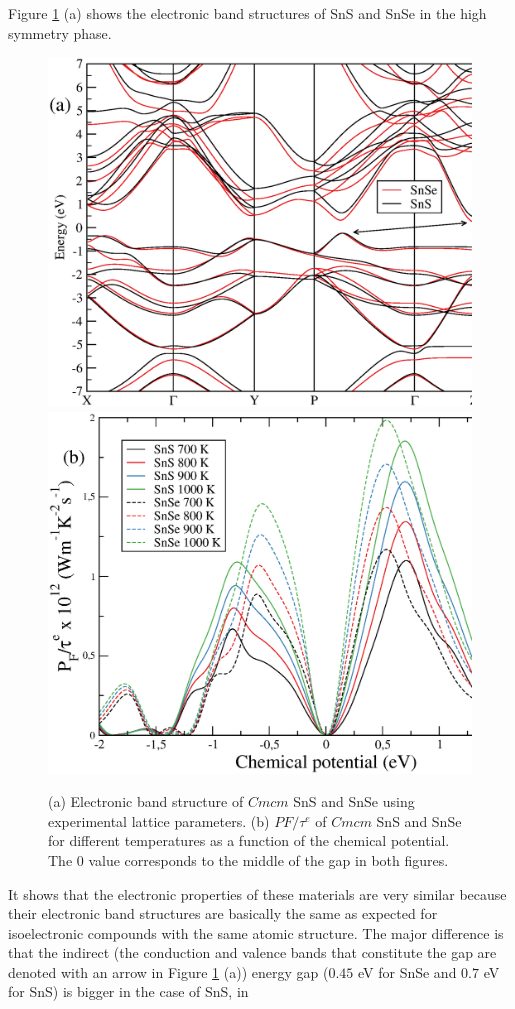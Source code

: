 Figure \ref{bands} (a) shows the electronic band structures of SnS and SnSe in the high symmetry phase.
\begin{figure}[h]
\begin{center}
\includegraphics[width=0.7\linewidth]{Figures/bands.eps}
\includegraphics[width=0.7\linewidth]{Figures/PF.eps}
\caption[Band structure and $P_{F}$ of SnS and SnSe.]{(a) Electronic band structure of $Cmcm$ SnS and SnSe using experimental lattice parameters. (b) $PF/\tau^{e}$ of $Cmcm$ SnS and SnSe for different temperatures as a function of the 
chemical potential. The $0$ value corresponds to the middle of the gap in both figures.}
\label{bands}
\end{center}
\end{figure}
It shows that the electronic properties of these materials are very similar because their electronic band structures are basically the same as expected for isoelectronic compounds with the same atomic structure. The major
difference is that the indirect (the conduction and valence bands that constitute the gap are denoted with an arrow in Figure \ref{bands} (a)) energy gap ($0.45$ eV for SnSe and $0.7$ eV for SnS) is bigger in the case of SnS, in
